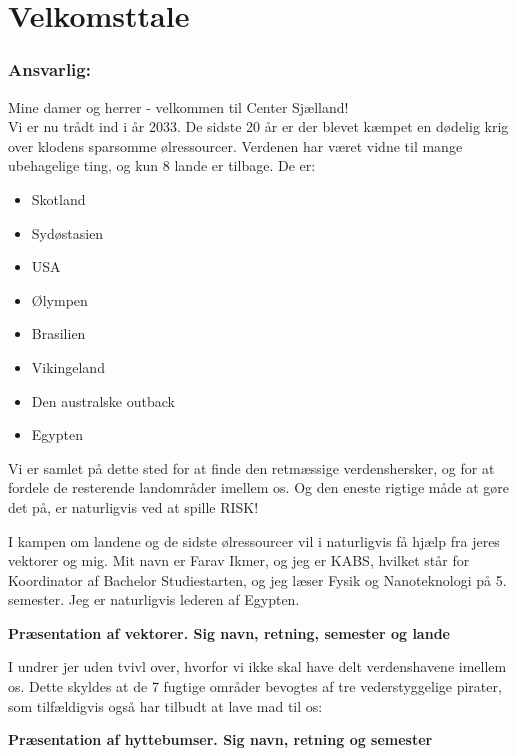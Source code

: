 \section{Velkomsttale}
\subsubsection*{\textbf{Ansvarlig:} \Farav }

Mine damer og herrer - velkommen til Center Sjælland!\\
Vi er nu trådt ind i år 2033. De sidste 20 år er der blevet kæmpet en dødelig krig over klodens sparsomme ølressourcer. Verdenen har været vidne til mange ubehagelige ting, og kun 8 lande er tilbage. De er:

\begin{itemize}
  \item Skotland
  \item Sydøstasien
  \item USA
  \item Ølympen
  \item Brasilien
  \item Vikingeland
  \item Den australske outback
  \item Egypten
\end{itemize}

Vi er samlet på dette sted for at finde den retmæssige verdenshersker, og for at fordele de resterende landområder imellem os. Og den eneste rigtige måde at gøre det på, er naturligvis ved at spille RISK!

I kampen om landene og de sidste ølressourcer vil i naturligvis få hjælp fra jeres vektorer og mig. Mit navn er Farav Ikmer, og jeg er KABS, hvilket står for Koordinator af Bachelor Studiestarten, og jeg læser Fysik og Nanoteknologi på 5. semester. Jeg er naturligvis lederen af Egypten.

\vspace{12pt}
\textbf{Præsentation af vektorer. Sig navn, retning, semester og lande\\
\clint \buddha \stive \hemorides \randildo \karla \mighty 
}\vspace{12pt}

I undrer jer uden tvivl over, hvorfor vi ikke skal have delt verdenshavene imellem os. Dette skyldes at de 7 fugtige områder bevogtes af tre vederstyggelige pirater, som tilfældigvis også har tilbudt at lave mad til os:

\vspace{12pt}
\textbf{Præsentation af hyttebumser. Sig navn, retning og semester\\
}\vspace{12pt}

